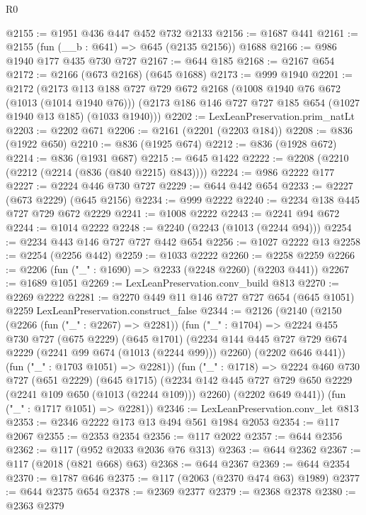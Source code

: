 \begin{lexlean}{R0}
\begin{coremodule}
@2155 := @1951 @436 @447 @452 @732 @2133
@2156 := @1687 @441
@2161 := @2155 (fun (__b : @641) => @645 (@2135 @2156)) @1688
@2166 := @986 @1940 @177 @435 @730 @727
@2167 := @644 @185
@2168 := @2167 @654
@2172 := @2166 (@673 @2168) (@645 @1688)
@2173 := @999 @1940
@2201 := @2172
    (@2173
      @113
      @188
      @727
      @729
      @672
      @2168
      (@1008 @1940 @76 @672 (@1013 (@1014 @1940 @76)))
      (@2173 @186 @146 @727 @727 @185 @654 (@1027 @1940 @13 @185) (@1033 @1940)))
@2202 := LexLeanPreservation.prim_natLt
@2203 := @2202 @671
@2206 := @2161 (@2201 (@2203 @184))
@2208 := @836 (@1922 @650)
@2210 := @836 (@1925 @674)
@2212 := @836 (@1928 @672)
@2214 := @836 (@1931 @687)
@2215 := @645 @1422
@2222 := @2208 (@2210 (@2212 (@2214 (@836 (@840 @2215) @843))))
@2224 := @986 @2222 @177
@2227 := @2224 @446 @730 @727
@2229 := @644 @442 @654
@2233 := @2227 (@673 @2229) (@645 @2156)
@2234 := @999 @2222
@2240 := @2234 @138 @445 @727 @729 @672 @2229
@2241 := @1008 @2222
@2243 := @2241 @94 @672
@2244 := @1014 @2222
@2248 := @2240 (@2243 (@1013 (@2244 @94)))
@2254 := @2234 @443 @146 @727 @727 @442 @654
@2256 := @1027 @2222 @13
@2258 := @2254 (@2256 @442)
@2259 := @1033 @2222
@2260 := @2258 @2259
@2266 := @2206 (fun ("_" : @1690) => @2233 (@2248 @2260) (@2203 @441))
@2267 := @1689 @1051
@2269 := LexLeanPreservation.conv_build @813
@2270 := @2269 @2222
@2281 := @2270 @449 @11 @146 @727 @727 @654 (@645 @1051) @2259 LexLeanPreservation.construct_false
@2344 := @2126
    (@2140
      (@2150
        (@2266 (fun ("_" : @2267) => @2281))
        (fun ("_" : @1704) =>
        @2224
          @455
          @730
          @727
          (@675 @2229)
          (@645 @1701)
          (@2234 @144 @445 @727 @729 @674 @2229 (@2241 @99 @674 (@1013 (@2244 @99))) @2260)
          (@2202 @646 @441))
        (fun ("_" : @1703 @1051) => @2281))
      (fun ("_" : @1718) =>
      @2224
        @460
        @730
        @727
        (@651 @2229)
        (@645 @1715)
        (@2234 @142 @445 @727 @729 @650 @2229 (@2241 @109 @650 (@1013 (@2244 @109))) @2260)
        (@2202 @649 @441))
      (fun ("_" : @1717 @1051) => @2281))
@2346 := LexLeanPreservation.conv_let @813
@2353 := @2346 @2222 @173 @13 @494 @561 @1984 @2053
@2354 := @117 @2067
@2355 := @2353 @2354
@2356 := @117 @2022
@2357 := @644 @2356
@2362 := @117 (@952 @2033 @2036 @76 @313)
@2363 := @644 @2362
@2367 := @117 (@2018 (@821 @668) @63)
@2368 := @644 @2367
@2369 := @644 @2354
@2370 := @1787 @646
@2375 := @117 (@2063 (@2370 @474 @63) @1989)
@2377 := @644 @2375 @654
@2378 := @2369 @2377
@2379 := @2368 @2378
@2380 := @2363 @2379

\end{coremodule}
\end{lexlean}
